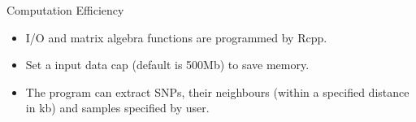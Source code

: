\documentclass{beamer}
\begin{document}
\begin{frame}{Computation Efficiency}

\begin{figure}[h]	\noindent{}
    \label{fig:benchmark}
\end{figure}

\begin{itemize}
    \item I/O and matrix algebra functions are programmed by Rcpp. 
    \item Set a input data cap (default is 500Mb) to save memory. 
    \item The program can extract SNPs, their neighbours (within a specified distance in kb) and samples specified by user. 
\end{itemize}
    
\end{frame}
\end{document}
